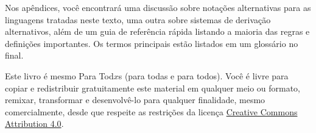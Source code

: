 Nos apêndices, você encontrará uma discussão sobre notações alternativas para as linguagens tratadas neste texto, uma outra sobre sistemas de derivação alternativos, além  de um guia de referência rápida listando a maioria das regras e definições importantes.
Os termos principais estão listados em um glossário no final.

Este livro é mesmo Para Tod$x$s (para todas e para todos).
Você é livre para copiar e redistribuir gratuitamente este material em qualquer meio ou formato, remixar, transformar e desenvolvê-lo para qualquer finalidade, mesmo comercialmente, desde que respeite as restrições da licença  \href{https://creativecommons.org/licenses/by/4.0/}{Creative Commons Attribution 4.0}.
